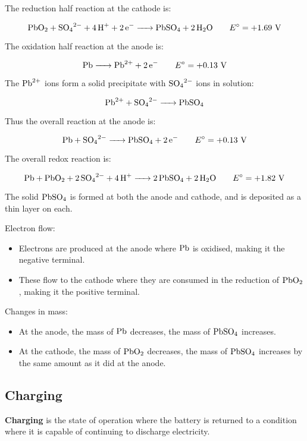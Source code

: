 \documentclass[a4paper,11pt]{article}
\begin{document}
The reduction half reaction at the cathode is:

$$
\ce{PbO2 + SO4^{2-} + 4H+ + 2e- -> PbSO4 + 2H2O} \qquad E^\circ = +1.69\text{ V}
$$

The oxidation half reaction at the anode is:

$$
\ce{Pb -> Pb^{2+} + 2e-} \qquad E^\circ = +0.13\text{ V}
$$

The $\ce{Pb^{2+}}$ ions form a solid precipitate with $\ce{SO4^{2-}}$ ions in
solution:

$$
\ce{Pb^{2+} + SO4^{2-} -> PbSO4}
$$

Thus the overall reaction at the anode is:

$$
\ce{Pb + SO4^{2-} -> PbSO4 + 2e-} \qquad E^\circ = +0.13\text{ V}
$$

The overall redox reaction is:

$$
\ce{Pb + PbO2 + 2SO4^{2-} + 4H+ -> 2PbSO4 + 2H2O} \qquad E^\circ = +1.82\text{ V}
$$

The solid $\ce{PbSO4}$ is formed at both the anode and cathode, and is deposited
as a thin layer on each.

Electron flow:

\begin{itemize}
\item Electrons are produced at the anode where $\ce{Pb}$ is oxidised, making
	it the negative terminal.
\item These flow to the cathode where they are consumed in the reduction of
	$\ce{PbO2}$, making it the positive terminal.
\end{itemize}

Changes in mass:

\begin{itemize}
\item At the anode, the mass of $\ce{Pb}$ decreases, the mass of $\ce{PbSO4}$
	increases.
\item At the cathode, the mass of $\ce{PbO2}$ decreases, the mass of
	$\ce{PbSO4}$ increases by the same amount as it did at the anode.
\end{itemize}

\subsection{Charging}

\textbf{Charging} is the state of operation where the battery is returned to a
condition where it is capable of continuing to discharge electricity.
\end{document}
